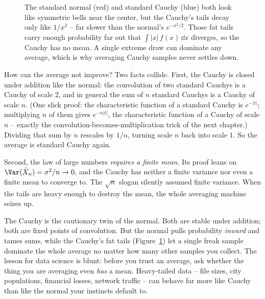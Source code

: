 \begin{figure}[H]
\centering
{}
\caption{The standard normal (red) and standard Cauchy (blue) both look like
symmetric bells near the center, but the Cauchy's tails decay only like
$1/x^2$ -- far slower than the normal's $e^{-x^2/2}$. Those fat tails carry
enough probability far out that $\int|x|\,f(x)\,\dd x$ diverges, so the Cauchy
has no mean. A single extreme draw can dominate any average, which is why
averaging Cauchy samples never settles down.}
\label{ch17:fig-cauchy}
\end{figure}

\begin{whybox}
How can the average not improve? Two facts collide. First, the Cauchy is
closed under addition like the normal: the convolution of two standard
Cauchys is a Cauchy of scale $2$, and in general the sum of $n$ standard
Cauchys is a Cauchy of scale $n$. (One slick proof: the characteristic
function of a standard Cauchy is $e^{-|t|}$; multiplying $n$ of them gives
$e^{-n|t|}$, the characteristic function of a Cauchy of scale $n$ --
exactly the convolution-becomes-multiplication trick of the next chapter.)
Dividing that sum by $n$ rescales by $1/n$, turning scale $n$ back into
scale $1$. So the average is standard Cauchy again.

Second, the law of large numbers \emph{requires a finite mean}. Its proof
leans on $\Var(\bar X_n)=\sigma^2/n\to 0$, and the Cauchy has neither a
finite variance nor even a finite mean to converge to. The $\sqrt n$
slogan silently assumed finite variance. When the tails are heavy enough
to destroy the mean, the whole averaging machine seizes up.
\end{whybox}

\begin{aestheticbox}
The Cauchy is the cautionary twin of the normal. Both are stable under
addition; both are fixed points of convolution. But the normal pulls
probability \emph{inward} and tames sums, while the Cauchy's fat tails (Figure~\ref{ch17:fig-cauchy}) let
a single freak sample dominate the whole average no matter how many other
samples you collect. The lesson for data science is blunt: before you
trust an average, ask whether the thing you are averaging even \emph{has}
a mean. Heavy-tailed data -- file sizes, city populations, financial
losses, network traffic -- can behave far more like Cauchy than like the
normal your instincts default to.
\end{aestheticbox}

